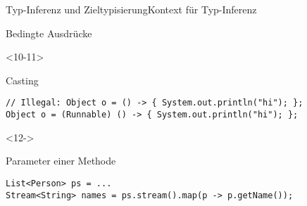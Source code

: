 \begin{frame}[fragile]{Typ-Inferenz und Zieltypisierung}{Kontext für Typ-Inferenz}
\begin{center}
\begin{minipage}[b]{0.75\textwidth}
\begin{onlyenv}
\begin{block}{Bedingte Ausdrücke \citep{goetz13}}
                \end{block}
            \end{onlyenv}
            \begin{onlyenv}<10-11>
                \begin{block}{Casting \citep{goetz13}}
                    \begin{lstlisting}
// Illegal: Object o = () -> { System.out.println("hi"); };
Object o = (Runnable) () -> { System.out.println("hi"); };
                    \end{lstlisting}
                \end{block}
            \end{onlyenv}
            \begin{onlyenv}<12->
                \begin{block}{Parameter einer Methode \citep{goetz13}}
                    \begin{lstlisting}
List<Person> ps = ...
Stream<String> names = ps.stream().map(p -> p.getName());
                    \end{lstlisting}
                \end{block}
            \end{onlyenv}
        \end{minipage}
    \end{center}


\end{frame}
